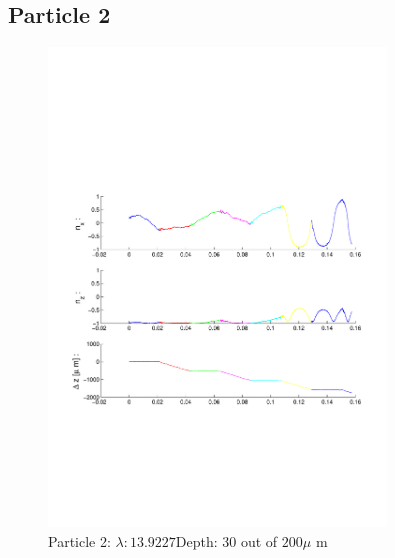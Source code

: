 \subsection{Particle 2}

\begin{figure}[ H]

\caption{Particle 2: $ \lambda: 13.9227$Depth: 30 out of $200 \mu $ m}

\centering

\includegraphics[width=0.8\textwidth]{Images/Particle 2/Particle2.pdf}

\end{figure}

